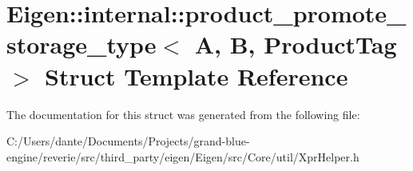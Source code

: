 \hypertarget{struct_eigen_1_1internal_1_1product__promote__storage__type}{}\section{Eigen\+::internal\+::product\+\_\+promote\+\_\+storage\+\_\+type$<$ A, B, Product\+Tag $>$ Struct Template Reference}
\label{struct_eigen_1_1internal_1_1product__promote__storage__type}


The documentation for this struct was generated from the following file\+:\begin{DoxyCompactItemize}
\item 
C\+:/\+Users/dante/\+Documents/\+Projects/grand-\/blue-\/engine/reverie/src/third\+\_\+party/eigen/\+Eigen/src/\+Core/util/Xpr\+Helper.\+h\end{DoxyCompactItemize}

